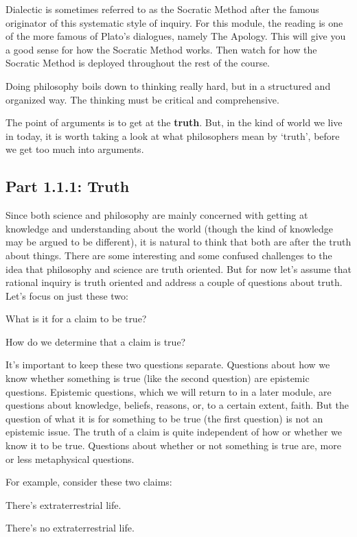 Dialectic is sometimes referred to as the Socratic Method after the famous originator of this systematic style of inquiry. For this module, the reading is one of the more famous of Plato’s dialogues, namely The Apology. This will give you a good sense for how the Socratic Method works. Then watch for how the Socratic Method is deployed throughout the rest of the course.

Doing philosophy boils down to thinking really hard, but in a structured and organized way. The thinking must be critical and comprehensive.

The point of arguments is to get at the \textbf{truth}. But, in the kind of world we live in today, it is worth taking a look at what philosophers mean by `truth', before we get too much into arguments.

\subsection{Part 1.1.1: Truth}
\label{s:p1.1.1}
Since both science and philosophy are mainly concerned with getting at knowledge and understanding about the world (though the kind of knowledge may be argued to be different), it is natural to think that both are after the truth about things. There are some interesting and some confused challenges to the idea that philosophy and science are truth oriented. But for now let’s assume that rational inquiry is truth oriented and address a couple of questions about truth. Let’s focus on just these two:
\begin{earg}
    \item[\ex{truth1}] What is it for a claim to be true?
    \item[\ex{truth2}] How do we determine that a claim is true?
\end{earg}
It’s important to keep these two questions separate. Questions about how we know whether something is true (like the second question) are epistemic questions. Epistemic questions, which we will return to in a later module, are questions about knowledge, beliefs, reasons, or, to a certain extent, faith. But the question of what it is for something to be true (the first question) is not an epistemic issue. The truth of a claim is quite independent of how or whether we know it to be true. Questions about whether or not something is true are, more or less metaphysical questions.

For example, consider these two claims:

\begin{earg}
    \item[] There's extraterrestrial life.
    \item[] There's no extraterrestrial life. 
\end{earg}



